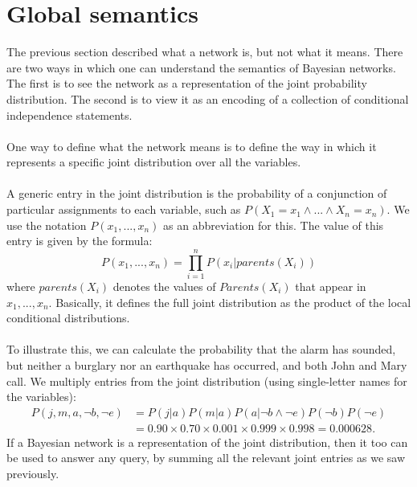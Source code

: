 \section{Global semantics}
The previous section described what a network is, but not what it means. There are two ways in which one can understand the semantics of Bayesian networks. The first is to see the network as a representation of the joint probability distribution. The second is to view it as an encoding of a collection of conditional independence statements.\\\\
One way to define what the network means is to define the way in which it represents a specific joint distribution over all the variables.\\\\
A generic entry in the joint distribution is the probability of a conjunction of particular assignments to each variable, such as $P(X_1 = x_1 \land ... \land X_n = x_n)$. We use the notation $P(x_1,...,x_n)$ as an abbreviation for this. The value of this entry is given by the formula:
\[P(x_1, ..., x_n) = \prod_{i=1}^n P(x_i | parents(X_i))\]
where $parents(X_i)$ denotes the values of $Parents(X_i)$ that appear in $x_1,...,x_n$. Basically, it defines the full joint distribution as the product of the local conditional distributions.\\\\
To illustrate this, we can calculate the probability that the alarm has sounded, but neither a burglary nor an earthquake has occurred, and both John and Mary call. We multiply entries from the joint distribution (using single-letter names for the variables):
\[\begin{split}
    P(j, m, a,\neg b,\neg e) & = P(j | a)P(m | a)P(a | \neg b \land \neg e)P(\neg b)P(\neg e)\\
    & = 0.90 \times 0.70 \times 0.001 \times 0.999 \times 0.998 = 0.000628 .
\end{split}\]
If a Bayesian network is a representation of the joint distribution, then it too can be used to answer any query, by summing all the relevant joint entries as we saw previously.

